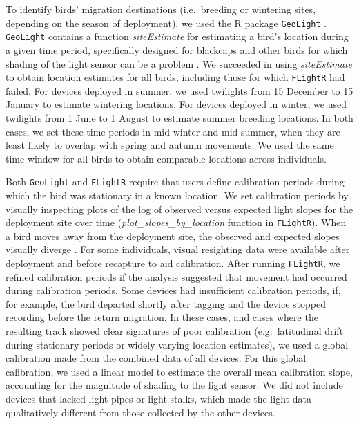 \documentclass[a4paper, twoside]{templates/ociamthesis}
\begin{document}
To identify birds' migration destinations (i.e.~breeding or wintering sites, depending on the season of deployment), we used the R package \texttt{GeoLight} \autocite{lisovskiGeoLightProcessingAnalysing2012}. \texttt{GeoLight} contains a function \emph{siteEstimate} for estimating a bird's location during a given time period, specifically designed for blackcaps and other birds for which shading of the light sensor can be a problem \autocite{hiemerFirstTracksIndividual2018}. We succeeded in using \emph{siteEstimate} to obtain location estimates for all birds, including those for which \texttt{FLightR} had failed. For devices deployed in summer, we used twilights from 15 December to 15 January to estimate wintering locations. For devices deployed in winter, we used twilights from 1 June to 1 August to estimate summer breeding locations. In both cases, we set these time periods in mid-winter and mid-summer, when they are least likely to overlap with spring and autumn movements. We used the same time window for all birds to obtain comparable locations across individuals.

Both \texttt{GeoLight} and \texttt{FLightR} require that users define calibration periods during which the bird was stationary in a known location. We set calibration periods by visually inspecting plots of the log of observed versus expected light slopes for the deployment site over time (\emph{plot\_slopes\_by\_location} function in \texttt{FLightR}). When a bird moves away from the deployment site, the observed and expected slopes visually diverge \autocite{lisovskiLightlevelGeolocatorAnalyses2020}. For some individuals, visual resighting data were available after deployment and before recapture to aid calibration. After running \texttt{FLightR}, we refined calibration periods if the analysis suggested that movement had occurred during calibration periods. Some devices had insufficient calibration periods, if, for example, the bird departed shortly after tagging and the device stopped recording before the return migration. In these cases, and cases where the resulting track showed clear signatures of poor calibration (e.g.~latitudinal drift during stationary periods or widely varying location estimates), we used a global calibration made from the combined data of all devices. For this global calibration, we used a linear model to estimate the overall mean calibration slope, accounting for the magnitude of shading to the light sensor. We did not include devices that lacked light pipes or light stalks, which made the light data qualitatively different from those collected by the other devices.
\end{document}
